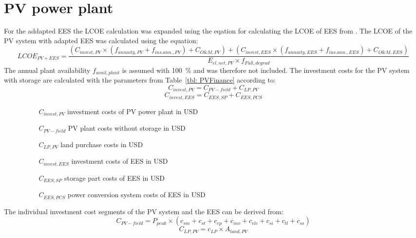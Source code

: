 \section{PV power plant}
For the addapted EES the LCOE calculation was expanded using the eqation for calculating the LCOE of EES from \cite{Corcuera2015}. The LCOE of the PV system with adapted EES was calculated using the equation:  
\begin{equation}
LCOE_{PV+EES}=\frac{(C_{invest,PV}\times(f_{annuity,PV}+f_{ins.ann.,PV})+C_{O\&M,PV})+(C_{invest,EES}\times(f_{annuity,EES}+f_{ins.ann.,EES})+C_{O\&M,EES})}{E_{el,net,PV} \times f_{Full,degrad}}\label{eq:LCOE_PV}
\end{equation}
The annual plant availability $f_{avail,plant}$ is assumed with 100~\% and was therefore not included. The investment costs for the PV system with storage are calculated with the parameters from Table~\ref{tbl: PVFinance} according to:
\begin{equation}
C_{invest,PV} = C_{PV-field}+C_{LP,PV}
\end{equation} 
\begin{equation}
C_{invest,EES} = C_{EES,SP}+C_{EES,PCS}
\end{equation} 
\begin{itemize}
\item[ ] 
\begin{itemize}
\item[ ] 
\begin{itemize}
\item[$C_{invest,PV}$]investment costs of PV power plant in USD
\item[$C_{PV-field}$]PV plant costs without storage in USD
\item[$C_{LP,PV}$]land purchase costs in USD
\item[$C_{invest,EES}$]investment costs of EES in USD
\item[$C_{EES,SP}$]storage part costs of EES in USD
\item[$C_{EES,PCS}$]power conversion system costs of EES in USD
\end{itemize}
\end{itemize}
\end{itemize}
The individual investment cost segments of the PV system and the  EES can be derived from:
\begin{equation}
C_{PV-field} = P_{peak} \times (c_{sm}+c_{st}+c_{ep}+c_{inv}+c_{elc}+c_{si}+c_{tl}+c_{ss})
\end{equation} 
\begin{equation}
C_{LP,PV} = c_{LP}\times A_{land,PV}
\end{equation} 
